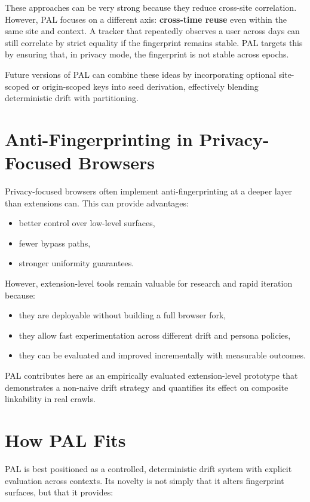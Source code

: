 \documentclass[11pt]{report}
\begin{document}
These approaches can be very strong because they reduce cross-site correlation. However, PAL focuses on a different axis: \textbf{cross-time reuse} even within the same site and context. A tracker that repeatedly observes a user across days can still correlate by strict equality if the fingerprint remains stable. PAL targets this by ensuring that, in privacy mode, the fingerprint is not stable across epochs.

Future versions of PAL can combine these ideas by incorporating optional site-scoped or origin-scoped keys into seed derivation, effectively blending deterministic drift with partitioning.

\section{Anti-Fingerprinting in Privacy-Focused Browsers}

Privacy-focused browsers often implement anti-fingerprinting at a deeper layer than extensions can. This can provide advantages:

\begin{itemize}
    \item better control over low-level surfaces,
    \item fewer bypass paths,
    \item stronger uniformity guarantees.
\end{itemize}

However, extension-level tools remain valuable for research and rapid iteration because:

\begin{itemize}
    \item they are deployable without building a full browser fork,
    \item they allow fast experimentation across different drift and persona policies,
    \item they can be evaluated and improved incrementally with measurable outcomes.
\end{itemize}

PAL contributes here as an empirically evaluated extension-level prototype that demonstrates a non-naive drift strategy and quantifies its effect on composite linkability in real crawls.

\section{How PAL Fits}

PAL is best positioned as a controlled, deterministic drift system with explicit evaluation across contexts. Its novelty is not simply that it alters fingerprint surfaces, but that it provides:
\end{document}
